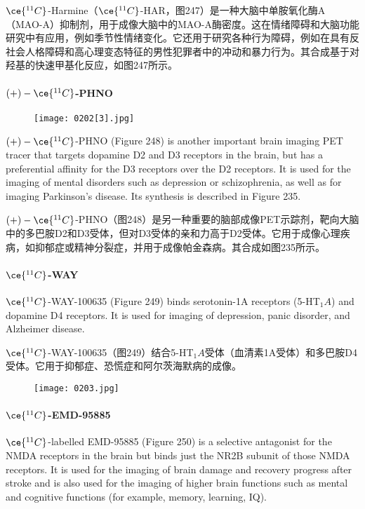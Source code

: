 \documentclass[dvipsnames, svgnames,a4paper,11pt]{article}
\begin{document}
\(\ce{^{11}C}\)-Harmine（\(\ce{^{11}C}\)-HAR，图247）是一种大脑中单胺氧化酶A（MAO-A）抑制剂，用于成像大脑中的MAO-A酶密度。这在情绪障碍和大脑功能研究中有应用，例如季节性情绪变化。它还用于研究各种行为障碍，例如在具有反社会人格障碍和高心理变态特征的男性犯罪者中的冲动和暴力行为。其合成基于对羟基的快速甲基化反应，如图247所示。



\paragraph{\((+)-\ce{^{11}C}\)-PHNO}  


\begin{wrapfigure}{r}{0.4\textwidth}
    \centering
    \texttt{[image: 0202[3].jpg]}
     \label{fig248}
\end{wrapfigure}

\((+)-\ce{^{11}C}\)-PHNO (Figure 248) is another important brain imaging PET tracer that targets dopamine D2 and D3 receptors in the brain, but has a preferential affinity for the D3 receptors over the D2 receptors. It is used for the imaging of mental disorders such as depression or schizophrenia, as well as for imaging Parkinson's disease. Its synthesis is described in Figure 235.

\((+)-\ce{^{11}C}\)-PHNO（图248）是另一种重要的脑部成像PET示踪剂，靶向大脑中的多巴胺D2和D3受体，但对D3受体的亲和力高于D2受体。它用于成像心理疾病，如抑郁症或精神分裂症，并用于成像帕金森病。其合成如图235所示。

\paragraph{\(\ce{^{11}C}\)-WAY}  
\(\ce{^{11}C}\)-WAY-100635 (Figure 249) binds serotonin-1A receptors (5-HT\(_1A\)) and dopamine D4 receptors. It is used for imaging of depression, panic disorder, and Alzheimer disease.

\(\ce{^{11}C}\)-WAY-100635（图249）结合5-HT\(_1A\)受体（血清素1A受体）和多巴胺D4受体。它用于抑郁症、恐慌症和阿尔茨海默病的成像。

\begin{figure}[h]
	\centering
    \texttt{[image: 0203.jpg]}  
     \label{fig249}
\end{figure}

\paragraph{\(\ce{^{11}C}\)-EMD-95885}  
\(\ce{^{11}C}\)-labelled EMD-95885 (Figure 250) is a selective antagonist for the NMDA receptors in the brain but binds just the NR2B subunit of those NMDA receptors. It is used for the imaging of brain damage and recovery progress after stroke and is also used for the imaging of higher brain functions such as mental and cognitive functions (for example, memory, learning, IQ).
\end{document}
